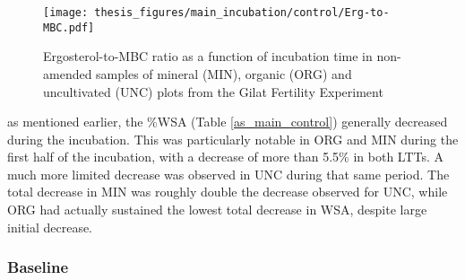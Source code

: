 \documentclass[12pt]{report}
\begin{document}
		
		\begin{figure}[H]
			\centering
			\texttt{[image: thesis\_figures/main\_incubation/control/Erg-to-MBC.pdf]}
			\caption{Ergosterol-to-MBC ratio as a function of incubation time in non-amended samples of mineral (MIN), organic (ORG) and uncultivated (UNC) plots from the Gilat Fertility Experiment}
			\label{fig:erg_to_biomass_control_main}
		\end{figure}
		\noindent as mentioned earlier, the $ \% $WSA (Table \ref{as_main_control}) generally decreased   during the incubation. This was particularly notable in ORG and MIN during the first half of the incubation, with a decrease of more than 5.5\% in both LTTs. A much more limited decrease was observed in UNC during that same period. The total decrease in MIN was roughly double the decrease observed for UNC, while ORG had actually sustained the lowest total decrease in WSA, despite large initial decrease. \\
		
		
		\subsubsection{Baseline}
		\label{Baseline}
		
\end{document}
